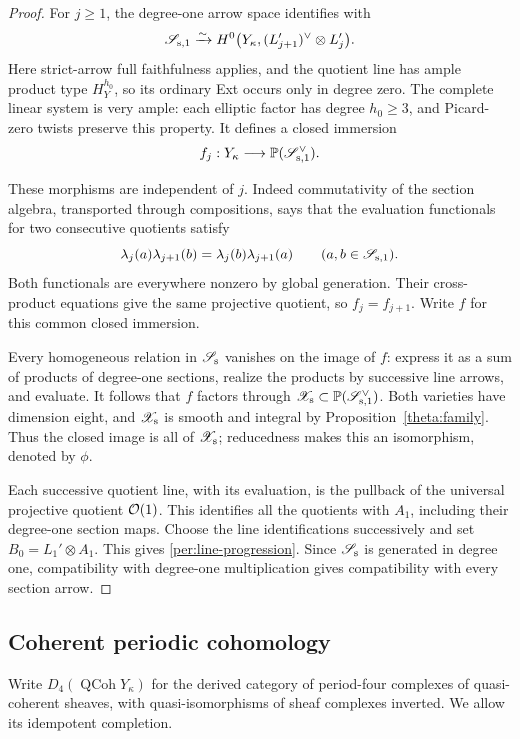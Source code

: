 \begin{proof}
For $j\ge1$, the degree-one arrow space identifies with
\[
 \mathscr S_{{\rm s},1}
    \xrightarrow{\sim}
 H^0\bigl(Y_\kappa,(L_{j+1}')^\vee\otimes L_j'\bigr).
\]
Here strict-arrow full faithfulness applies, and the quotient line
has ample product type $H_Y^{h_0}$, so its ordinary Ext occurs only
in degree zero.  The complete linear system is very ample: each
elliptic factor has degree $h_0\ge3$, and Picard-zero twists preserve
this property.  It defines a closed immersion
\[
 f_j:Y_\kappa\longrightarrow
        \mathbb P(\mathscr S_{{\rm s},1}^{\vee}).
\]

These morphisms are independent of $j$.  Indeed commutativity of
the section algebra, transported through compositions, says that
the evaluation functionals for two consecutive quotients satisfy
\[
 \lambda_j(a)\lambda_{j+1}(b)
       =\lambda_j(b)\lambda_{j+1}(a)
       \qquad(a,b\in\mathscr S_{{\rm s},1}).
\]
Both functionals are everywhere nonzero by global generation.
Their cross-product equations give the same projective quotient,
so $f_j=f_{j+1}$.  Write $f$ for this common closed immersion.

Every homogeneous relation in $\mathscr S_{\rm s}$ vanishes on
the image of $f$: express it as a sum of products of degree-one
sections, realize the products by successive line arrows, and
evaluate.  It follows that $f$ factors through
$\mathscr X_{\rm s}\subset
\mathbb P(\mathscr S_{{\rm s},1}^{\vee})$.  Both varieties have
dimension eight, and $\mathscr X_{\rm s}$ is smooth and integral
by Proposition~\ref{theta:family}.  Thus the closed image is all of
$\mathscr X_{\rm s}$; reducedness makes this an isomorphism, denoted
by $\phi$.

Each successive quotient line, with its evaluation, is the pullback
of the universal projective quotient $\mathcal O(1)$.  This identifies all
the quotients with $A_1$, including their degree-one section maps.
Choose the line identifications successively and set
$B_0=L_1'\otimes A_1$.  This gives
\eqref{per:line-progression}.  Since $\mathscr S_{\rm s}$ is generated
in degree one, compatibility with degree-one multiplication gives
compatibility with every section arrow.
\end{proof}

\subsection{Coherent periodic cohomology}

Write $D_4(\operatorname{QCoh}Y_\kappa)$ for the derived category of
period-four complexes of quasi-coherent sheaves, with
quasi-isomorphisms of sheaf complexes inverted.  We allow its idempotent
completion.

